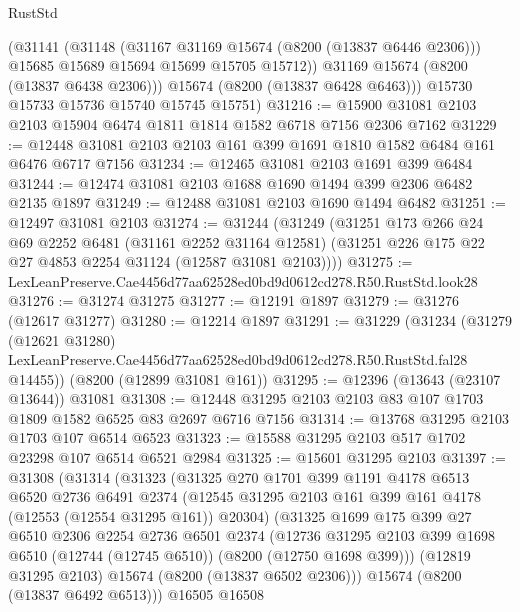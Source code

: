 \begin{lexlean}{RustStd}
\begin{coremodule}
          (@31141
            (@31148
              (@31167 @31169 @15674 (@8200 (@13837 @6446 @2306)))
              @15685
              @15689
              @15694
              @15699
              @15705
              @15712))
          @31169
          @15674
          (@8200 (@13837 @6438 @2306)))
        @15674
        (@8200 (@13837 @6428 @6463)))
      @15730
      @15733
      @15736
      @15740
      @15745
      @15751)
@31216 := @15900 @31081 @2103 @2103 @15904 @6474 @1811 @1814 @1582 @6718 @7156 @2306 @7162
@31229 := @12448 @31081 @2103 @2103 @161 @399 @1691 @1810 @1582 @6484 @161 @6476 @6717 @7156
@31234 := @12465 @31081 @2103 @1691 @399 @6484
@31244 := @12474 @31081 @2103 @1688 @1690 @1494 @399 @2306 @6482 @2135 @1897
@31249 := @12488 @31081 @2103 @1690 @1494 @6482
@31251 := @12497 @31081 @2103
@31274 := @31244
    (@31249
      (@31251
        @173
        @266
        @24
        @69
        @2252
        @6481
        (@31161 @2252 @31164 @12581)
        (@31251 @226 @175 @22 @27 @4853 @2254 @31124 (@12587 @31081 @2103))))
@31275 := LexLeanPreserve.Cae4456d77aa62528ed0bd9d0612cd278.R50.RustStd.look28
@31276 := @31274 @31275
@31277 := @12191 @1897
@31279 := @31276 (@12617 @31277)
@31280 := @12214 @1897
@31291 := @31229
    (@31234
      (@31279
        (@12621 @31280)
        LexLeanPreserve.Cae4456d77aa62528ed0bd9d0612cd278.R50.RustStd.fal28
        @14455))
    (@8200 (@12899 @31081 @161))
@31295 := @12396 (@13643 (@23107 @13644)) @31081
@31308 := @12448 @31295 @2103 @2103 @83 @107 @1703 @1809 @1582 @6525 @83 @2697 @6716 @7156
@31314 := @13768 @31295 @2103 @1703 @107 @6514 @6523
@31323 := @15588 @31295 @2103 @517 @1702 @23298 @107 @6514 @6521 @2984
@31325 := @15601 @31295 @2103
@31397 := @31308
    (@31314
      (@31323
        (@31325
          @270
          @1701
          @399
          @1191
          @4178
          @6513
          @6520
          @2736
          @6491
          @2374
          (@12545 @31295 @2103 @161 @399 @161 @4178 (@12553 (@12554 @31295 @161)) @20304)
          (@31325
            @1699
            @175
            @399
            @27
            @6510
            @2306
            @2254
            @2736
            @6501
            @2374
            (@12736
              @31295
              @2103
              @399
              @1698
              @6510
              (@12744 (@12745 @6510))
              (@8200 (@12750 @1698 @399)))
            (@12819 @31295 @2103)
            @15674
            (@8200 (@13837 @6502 @2306)))
          @15674
          (@8200 (@13837 @6492 @6513)))
        @16505
        @16508

\end{coremodule}
\end{lexlean}
